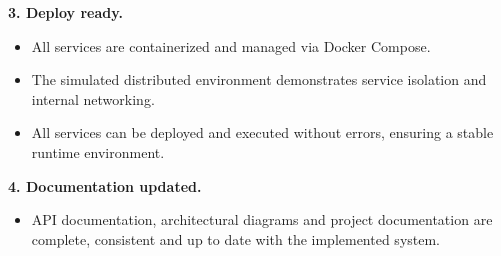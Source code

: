 \noindent\textbf{3. Deploy ready.}
\begin{itemize}
  \item All services are containerized and managed via Docker Compose.
  \item The simulated distributed environment demonstrates service isolation and internal networking.
  \item All services can be deployed and executed without errors, ensuring a stable runtime environment.
\end{itemize}

\noindent\textbf{4. Documentation updated.}
\begin{itemize}
  \item API documentation, architectural diagrams and project documentation are complete, consistent and up to date with the implemented system.
\end{itemize}
